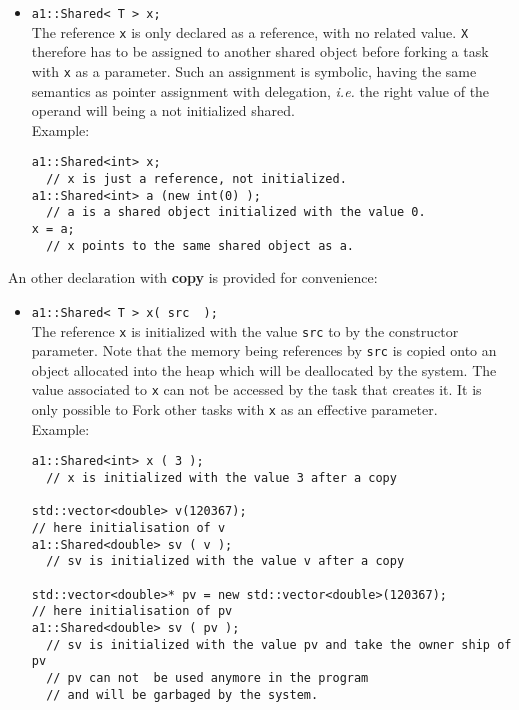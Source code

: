 \begin{itemize}
\item
\verb!a1::Shared< T > x;!\\
The reference \verb!x!  is only declared as a reference, with no related value. \verb!X! 
therefore has to be assigned  to another shared object before forking a task 
with \verb!x!  as a parameter. 
Such an assignment is symbolic, having the same semantics as pointer assignment with delegation, \textit{i.e.} the right value of the operand will being a not initialized shared.\\
Example:
\begin{boxit}
\begin{verbatim}
a1::Shared<int> x;
  // x is just a reference, not initialized.
a1::Shared<int> a (new int(0) );
  // a is a shared object initialized with the value 0.
x = a;
  // x points to the same shared object as a.
\end{verbatim}
\end{boxit}
\end{itemize}
An other declaration with \textbf{copy} is provided for convenience:
\begin{itemize}
\item 
\verb!a1::Shared< T > x( src  );!\\
The reference \verb!x! is initialized
with the value \verb+src+ to by the constructor parameter.
Note that the memory being references by \verb+src+ is copied onto an object
allocated into the heap which will be deallocated 
by the system. The value associated to  \verb!x! can not be
accessed by the task that creates it.
It is only possible to Fork other tasks with \verb+x+ as an effective parameter.\\
Example:
\begin{boxit}
\begin{verbatim}
a1::Shared<int> x ( 3 );
  // x is initialized with the value 3 after a copy

std::vector<double> v(120367);
// here initialisation of v
a1::Shared<double> sv ( v );
  // sv is initialized with the value v after a copy

std::vector<double>* pv = new std::vector<double>(120367);
// here initialisation of pv
a1::Shared<double> sv ( pv );
  // sv is initialized with the value pv and take the owner ship of pv
  // pv can not  be used anymore in the program 
  // and will be garbaged by the system.
\end{verbatim}
\end{boxit}
\end{itemize}

